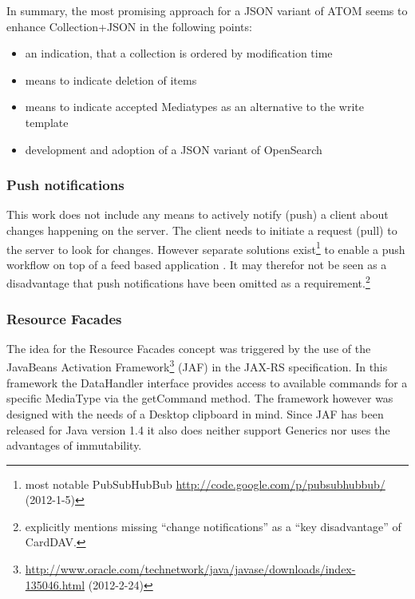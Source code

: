 \documentclass[11pt,a4paper,headsepline,twoside]{scrartcl}		%
\newcommand{\citeurl}[2]{\url{#1} (#2)}
\begin{document}
In summary, the most promising approach for a JSON variant of ATOM seems to
enhance Collection+JSON in the following points:

\begin{itemize}
\item an indication, that a collection is ordered by modification time
\item means to indicate deletion of items
\item means to indicate accepted Mediatypes as an alternative to the write
  template
\item development and adoption of a JSON variant of OpenSearch
\end{itemize}


\subsubsection{Push notifications}

This work does not include any means to actively notify (push) a client about
changes happening on the server. The client needs to initiate a request (pull)
to the server to look for changes. However separate solutions
exist\footnote{most notable PubSubHubBub
  \citeurl{http://code.google.com/p/pubsubhubbub/}{2012-1-5}} to enable a push
workflow on top of a feed based
application \cite{Wilde:2009:FQP:1693155.1693220}. It may therefor not be seen as
a disadvantage that push notifications have been omitted as a
requirement.\footnote{\cite[sec. 1]{RFC6352} explicitly mentions missing
  ``change notifications'' as a ``key disadvantage'' of CardDAV.}

\subsubsection{Resource Facades}
\label{sec:resourcefacadesfuture-work}

The idea for the Resource Facades concept was triggered by the use of the
JavaBeans Activation
Framework\footnote{\citeurl{http://www.oracle.com/technetwork/java/javase/downloads/index-135046.html}{2012-2-24}}
(JAF) in the JAX-RS specification. In this framework the DataHandler interface
provides access to available commands for a specific MediaType via the
getCommand method. The framework however was designed with the needs of a
Desktop clipboard in mind. Since JAF has been released for Java version 1.4 it
also does neither support Generics nor uses the advantages of immutability.
\end{document}
